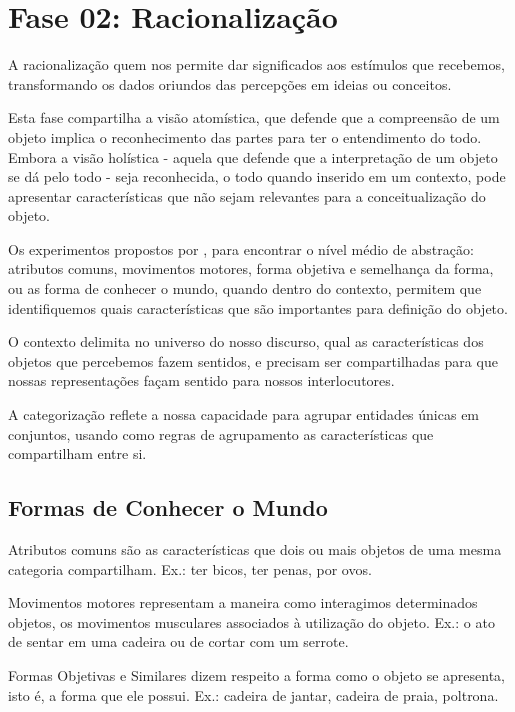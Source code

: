 \section{\hspace*{3pt} Fase 02: Racionalização}
\label{sec:racionalizacao}

A racionalização quem nos permite dar significados aos estímulos que recebemos, transformando os dados oriundos das percepções em ideias ou conceitos.

Esta fase compartilha a visão atomística, que defende que a compreensão de um objeto implica o reconhecimento das partes para ter o entendimento do todo. Embora a visão holística - aquela que defende que a interpretação de um objeto se dá pelo todo - seja reconhecida, o todo quando inserido em um contexto, pode apresentar características que não sejam relevantes para a conceitualização do objeto.

Os experimentos propostos por \citet{rosch:1999.principles}, para encontrar o nível médio de abstração: atributos comuns, movimentos motores, forma objetiva e semelhança da forma, ou as forma de conhecer o mundo, quando dentro do contexto, permitem que identifiquemos quais características que são importantes para definição do objeto. 

O contexto delimita no universo do nosso discurso, qual as características dos objetos que percebemos fazem sentidos, e precisam ser compartilhadas para que nossas representações façam sentido para nossos interlocutores.  

A categorização reflete a nossa capacidade para agrupar entidades únicas em conjuntos, usando como regras de agrupamento as características que compartilham entre si. 

\subsection{\hspace*{3pt} Formas de Conhecer o Mundo}

Atributos comuns são as características que dois ou mais objetos de uma mesma categoria compartilham. Ex.: ter bicos, ter penas, por ovos.

Movimentos motores representam a maneira como interagimos determinados objetos, os movimentos musculares associados à utilização do objeto. Ex.: o ato de sentar em uma cadeira ou de cortar com um serrote.

Formas Objetivas e Similares dizem respeito a forma como o objeto se apresenta, isto é, a forma que ele possui. Ex.: cadeira de jantar, cadeira de praia, poltrona.


